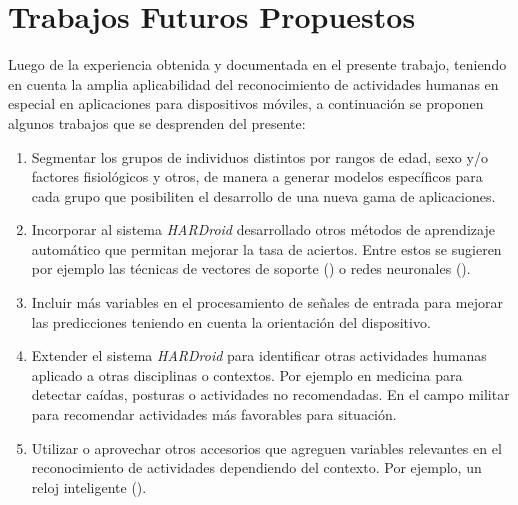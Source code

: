 \section{Trabajos Futuros Propuestos}

\label{sec82:trabajos-futuros}Luego de la experiencia obtenida y
documentada en el presente trabajo, teniendo en cuenta la amplia aplicabilidad
del reconocimiento de actividades humanas en especial en aplicaciones
para dispositivos móviles, a continuación se proponen algunos trabajos
que se desprenden del presente:
\begin{enumerate}
\item Segmentar los grupos de individuos distintos por rangos de edad, sexo
y/o factores fisiológicos y otros, de manera a generar modelos específicos
para cada grupo que posibiliten el desarrollo de una nueva gama de
aplicaciones. 
\item Incorporar al sistema \emph{HARDroid} desarrollado otros métodos de
aprendizaje automático que permitan mejorar la tasa de aciertos. Entre
estos se sugieren por ejemplo las técnicas de vectores de soporte
() o redes neuronales ().
\item Incluir más variables en el procesamiento de señales de entrada para
mejorar las predicciones teniendo en cuenta la orientación del dispositivo. 
\item Extender el sistema \emph{HARDroid} para identificar otras actividades
humanas aplicado a otras disciplinas o contextos. Por ejemplo en medicina
para detectar caídas, posturas o actividades no recomendadas. En el
campo militar para recomendar actividades más favorables para situación.
\item Utilizar o aprovechar otros accesorios que agreguen variables relevantes
en el reconocimiento de actividades dependiendo del contexto. Por
ejemplo, un reloj inteligente (\emph{}).
\end{enumerate}


